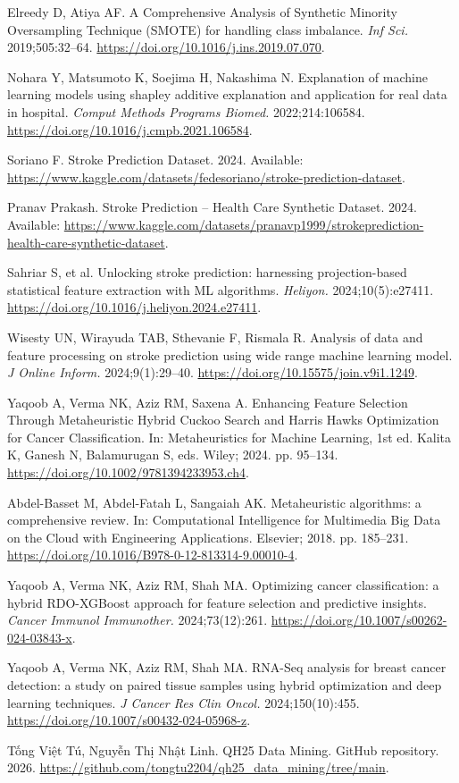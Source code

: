 \begin{enumerate}[label={[\arabic*]},leftmargin=1.2cm]
\item \hypertarget{bib:29}{}Elreedy D, Atiya AF. A Comprehensive Analysis of Synthetic Minority Oversampling Technique (SMOTE) for handling class imbalance. \textit{Inf Sci.} 2019;505:32--64. \url{https://doi.org/10.1016/j.ins.2019.07.070}.
\item \hypertarget{bib:30}{}Nohara Y, Matsumoto K, Soejima H, Nakashima N. Explanation of machine learning models using shapley additive explanation and application for real data in hospital. \textit{Comput Methods Programs Biomed.} 2022;214:106584. \url{https://doi.org/10.1016/j.cmpb.2021.106584}.
\item \hypertarget{bib:31}{}Soriano F. Stroke Prediction Dataset. 2024. Available: \url{https://www.kaggle.com/datasets/fedesoriano/stroke-prediction-dataset}.
\item \hypertarget{bib:32}{}Pranav Prakash. Stroke Prediction -- Health Care Synthetic Dataset. 2024. Available: \url{https://www.kaggle.com/datasets/pranavp1999/strokeprediction-health-care-synthetic-dataset}.
\item \hypertarget{bib:33}{}Sahriar S, et al. Unlocking stroke prediction: harnessing projection-based statistical feature extraction with ML algorithms. \textit{Heliyon.} 2024;10(5):e27411. \url{https://doi.org/10.1016/j.heliyon.2024.e27411}.
\item \hypertarget{bib:34}{}Wisesty UN, Wirayuda TAB, Sthevanie F, Rismala R. Analysis of data and feature processing on stroke prediction using wide range machine learning model. \textit{J Online Inform.} 2024;9(1):29--40. \url{https://doi.org/10.15575/join.v9i1.1249}.
\item \hypertarget{bib:35}{}Yaqoob A, Verma NK, Aziz RM, Saxena A. Enhancing Feature Selection Through Metaheuristic Hybrid Cuckoo Search and Harris Hawks Optimization for Cancer Classification. In: Metaheuristics for Machine Learning, 1st ed. Kalita K, Ganesh N, Balamurugan S, eds. Wiley; 2024. pp. 95--134. \url{https://doi.org/10.1002/9781394233953.ch4}.
\item \hypertarget{bib:36}{}Abdel-Basset M, Abdel-Fatah L, Sangaiah AK. Metaheuristic algorithms: a comprehensive review. In: Computational Intelligence for Multimedia Big Data on the Cloud with Engineering Applications. Elsevier; 2018. pp. 185--231. \url{https://doi.org/10.1016/B978-0-12-813314-9.00010-4}.
\item \hypertarget{bib:37}{}Yaqoob A, Verma NK, Aziz RM, Shah MA. Optimizing cancer classification: a hybrid RDO-XGBoost approach for feature selection and predictive insights. \textit{Cancer Immunol Immunother.} 2024;73(12):261. \url{https://doi.org/10.1007/s00262-024-03843-x}.
\item \hypertarget{bib:38}{}Yaqoob A, Verma NK, Aziz RM, Shah MA. RNA-Seq analysis for breast cancer detection: a study on paired tissue samples using hybrid optimization and deep learning techniques. \textit{J Cancer Res Clin Oncol.} 2024;150(10):455. \url{https://doi.org/10.1007/s00432-024-05968-z}.
\item \hypertarget{bib:39}{}Tống Việt Tú, Nguyễn Thị Nhật Linh.
QH25 Data Mining. GitHub repository. 2026.
\url{https://github.com/tongtu2204/qh25_data_mining/tree/main}.
\end{enumerate}
